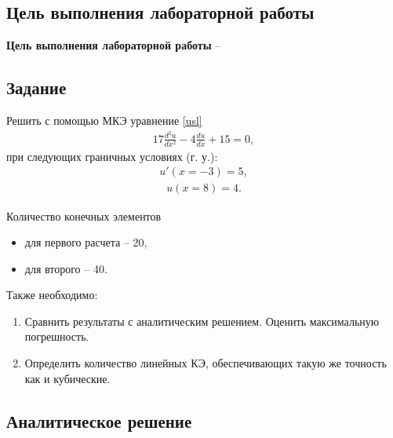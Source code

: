 \subsection{Цель выполнения лабораторной работы}\label{blockN.VariantM}
\textbf{Цель выполнения лабораторной работы }-- \GoalOfResearch

\subsection{Задание}

Решить с помощью МКЭ уравнение \ref{usl}
\begin{align}\label{usl}
17\frac{d^2u}{dx^2}
 -4 \frac{du}{dx}  
 + 15 
=0,
\end{align}
при следующих граничных условиях (г. у.): 
\begin{align}\label{2_rod}
    u'(x=-3) = 5,
\end{align}
\begin{align}\label{1_rod}
    u(x=8) = 4.
\end{align}

Количество конечных элементов
\begin{itemize}
    \item для первого расчета -- 20,
    \item для второго -- 40.
\end{itemize}

Также необходимо:
\begin{enumerate}
    \item Сравнить результаты с аналитическим решением. Оценить максимальную погрешность.
    \item Определить количество линейных КЭ, обеспечивающих такую же точность как и кубические.
\end{enumerate}

\newpage
\subsection{Аналитическое решение}

